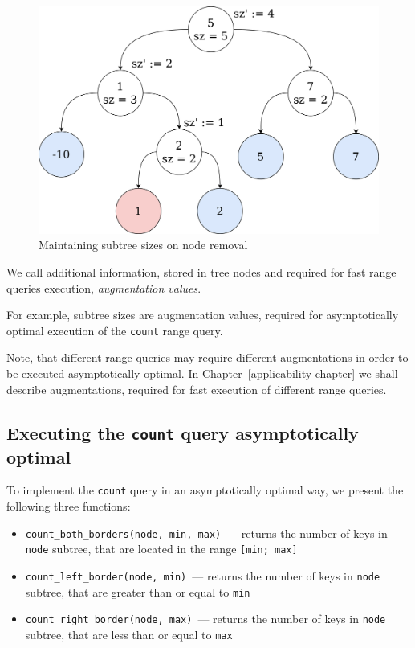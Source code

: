 \documentclass[times, dvipsnames,%
               languages={russian,english} %
              ]{itmo-student-thesis}
\begin{document}
\begin{figure}[H]
  \centering
  \caption{Maintaining subtree sizes on node removal}
  \label{remove-sizes-pic}
  \includegraphics[width=\linewidth]{pics/remove-sizes.png}
\end{figure}

\begin{definition}
We call additional information, stored in tree nodes and required for fast range queries execution, \emph{augmentation values}.

For example, subtree sizes are augmentation values, required for asymptotically optimal execution of the \texttt{count} range query.
\end{definition}

Note, that different range queries may require different augmentations in order to be executed asymptotically optimal. In Chapter~\ref{applicability-chapter} we shall describe augmentations, required for fast execution of different range queries.

\subsection{Executing the \texttt{count} query asymptotically optimal}

To implement the \texttt{count} query in an asymptotically optimal way, we present the following three functions:

\begin{itemize}
    \item \texttt{count\_both\_borders(node, min, max)}~--- returns the number of keys in \texttt{node} subtree, that are located in the range \texttt{[min; max]}
    
    \item \texttt{count\_left\_border(node, min)}~--- returns the number of keys in \texttt{node} subtree, that are greater than or equal to \texttt{min}
    
    \item \texttt{count\_right\_border(node, max)}~--- returns the number of keys in \texttt{node} subtree, that are less than or equal to \texttt{max}
\end{itemize}
\end{document}
